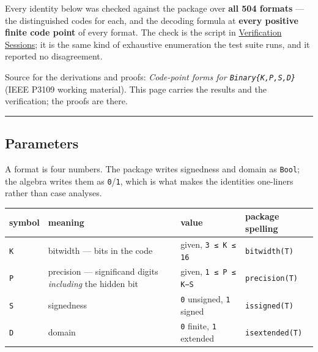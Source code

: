 \begin{tcolorbox}[toptitle=-1mm,bottomtitle=1mm,colback=admonition-note!50!white,colframe=admonition-note,title=\textbf{Verified, not transcribed}]
Every identity below was checked against the package over \textbf{all 504 formats} — the distinguished codes for each, and the decoding formula at \textbf{every positive finite code point} of every format. The check is the script in \href{examples\_\allowbreak{}verification.md}{Verification Sessions}; it is the same kind of exhaustive enumeration the test suite runs, and it reported no disagreement.

Source for the derivations and proofs: \emph{Code-point forms for \texttt{Binary\{K,P,S,D\}}} (IEEE P3109 working material). This page carries the results and the verification; the proofs are there.

\end{tcolorbox}


{\rule{\textwidth}{1pt}}


\subsection{Parameters}



\label{12886555095302773432}{}


A format is four numbers. The package writes signedness and domain as \texttt{Bool}; the algebra writes them as \texttt{0}/\allowbreak\texttt{1}, which is what makes the identities one-liners rather than case analyses.




\begin{table}[h]
\centering
\begin{tabulary}{\linewidth}{L L L L}
\toprule
symbol & meaning & value & package spelling \\
\toprule
\texttt{K} & bitwidth — bits in the code & given, \texttt{3 ≤ K ≤ 16} & \texttt{bitwidth(T)} \\
\texttt{P} & precision — significand digits \emph{including} the hidden bit & given, \texttt{1 ≤ P ≤ K−S} & \texttt{precision(T)} \\
\texttt{S} & signedness & \texttt{0} unsigned, \texttt{1} signed & \texttt{issigned(T)} \\
\texttt{D} & domain & \texttt{0} finite, \texttt{1} extended & \texttt{isextended(T)} \\
\bottomrule
\end{tabulary}

\end{table}



